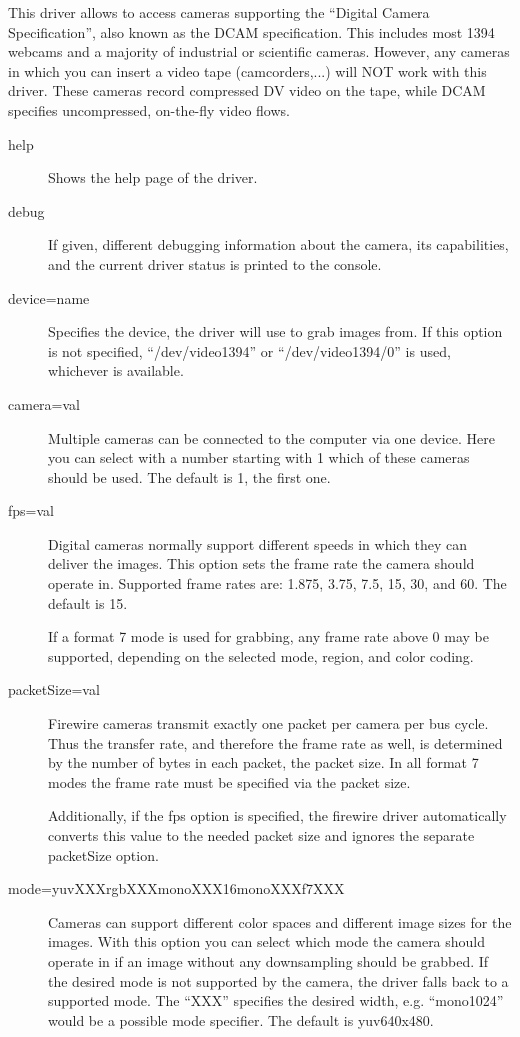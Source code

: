 This driver allows to access cameras supporting the ``Digital Camera
Specification'', also known as the DCAM specification. This includes
most 1394 webcams and a majority of industrial or scientific
cameras. However, any cameras in which you can insert a video tape
(camcorders,...) will NOT work with this driver. These cameras
record compressed DV video on the tape, while DCAM specifies
uncompressed, on-the-fly video flows.

\begin{description}
\item[help] Shows the help page of the driver.
\item[debug] If given, different debugging information about the
  camera, its capabilities, and the current driver status is
  printed to the console.
\item[device=name] Specifies the device, the driver will use to grab
  images from. If this option is not specified, ``/dev/video1394''
  or ``/dev/video1394/0'' is used, whichever is available.
\item[camera=val] Multiple cameras can be connected to the computer
  via one device. Here you can select with a number starting with 1
  which of these cameras should be used. The default is 1, the first
  one.
\item[fps=val] Digital cameras normally support different speeds in
  which they can deliver the images. This option sets the frame rate
  the camera should operate in. Supported frame rates are: 1.875,
  3.75, 7.5, 15, 30, and 60. The default is 15.

  If a format 7 mode is used for grabbing, any frame rate above 0
  may be supported, depending on the selected mode, region, and
  color coding.
\item[packetSize=val] Firewire cameras transmit exactly one packet
  per camera per bus cycle. Thus the transfer rate, and therefore
  the frame rate as well, is determined by the number of bytes in
  each packet, the packet size. In all format 7 modes the frame rate
  must be specified via the packet size.

  Additionally, if the fps option is specified, the firewire driver
  automatically converts this value to the needed packet size and
  ignores the separate packetSize option.
\item[mode=yuvXXX\textbar{}rgbXXX\textbar{}monoXXX\textbar{}16monoXXX\textbar{}f7XXX]
  Cameras can support different color spaces and different image
  sizes for the images. With this option you can select which mode
  the camera should operate in if an image without any downsampling
  should be grabbed. If the desired mode is not supported by the
  camera, the driver falls back to a supported mode. The ``XXX''
  specifies the desired width, e.g. ``mono1024'' would be a possible
  mode specifier. The default is yuv640x480.


\end{description}
